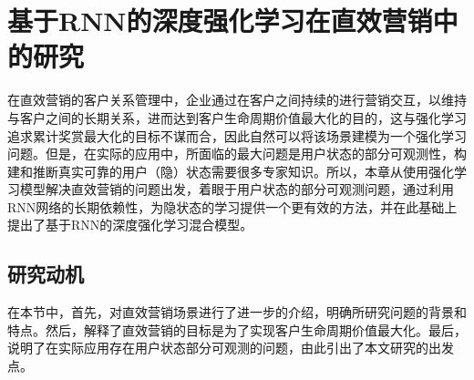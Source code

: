 \chapter{基于RNN的深度强化学习在直效营销中的研究}



在直效营销的客户关系管理中，企业通过在客户之间持续的进行营销交互，以维持与客户之间的长期关系，进而达到客户生命周期价值最大化的目的，这与强化学习追求累计奖赏最大化的目标不谋而合，因此自然可以将该场景建模为一个强化学习问题。但是，在实际的应用中，所面临的最大问题是用户状态的部分可观测性，构建和推断真实可靠的用户（隐）状态需要很多专家知识。所以，本章从使用强化学习模型解决直效营销的问题出发，着眼于用户状态的部分可观测问题，通过利用RNN网络的长期依赖性，为隐状态的学习提供一个更有效的方法，并在此基础上提出了基于RNN的深度强化学习混合模型。


\section{研究动机}
在本节中，首先，对直效营销场景进行了进一步的介绍，明确所研究问题的背景和特点。然后，解释了直效营销的目标是为了实现客户生命周期价值最大化。最后，说明了在实际应用存在用户状态部分可观测的问题，由此引出了本文研究的出发点。

